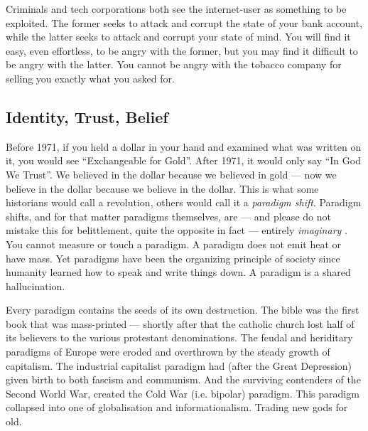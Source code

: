 \documentclass[a4paper]{article}
\begin{document}
Criminals and tech corporations both see the internet-user as something
to be exploited. The former seeks to attack and corrupt the state of
your bank account, while the latter seeks to attack and corrupt your
state of mind. You will find it easy, even effortless, to be angry with
the former, but you may find it difficult to be angry with the latter.
You cannot be angry with the tobacco company for selling you exactly
what you asked for.

\subsection{Identity, Trust, Belief}
Before 1971, if you held a dollar in your hand and examined what was
written on it, you would see ``Exchangeable for Gold''. After 1971, it
would only say ``In God We Trust''. We believed in the dollar because we
believed in gold --- now we believe in the dollar because we believe in
the dollar. This is what some historians would call a revolution, others
would call it a \emph{paradigm shift}. Paradigm shifts, and for that
matter paradigms themselves, are --- and please do not mistake this for
belittlement, quite the opposite in fact --- entirely \emph{imaginary
}. You cannot measure or touch a paradigm. A paradigm does not emit heat
or have mass. Yet paradigms have been the organizing principle of
society since humanity learned how to speak and write things down. A
paradigm is a shared hallucination.

Every paradigm contains the seeds of its own destruction. The bible was
the first book that was mass-printed --- shortly after that the catholic
church lost half of its believers to the various protestant
denominations. The feudal and heriditary paradigms of Europe were eroded
and overthrown by the steady growth of capitalism. The industrial
capitalist paradigm had (after the Great Depression) given birth to both
fascism and communism. And the surviving contenders of the
Second World War, created the Cold War (i.e. bipolar) paradigm. This
paradigm collapsed into one of globalisation and informationalism.
Trading new gods for old.
\end{document}
